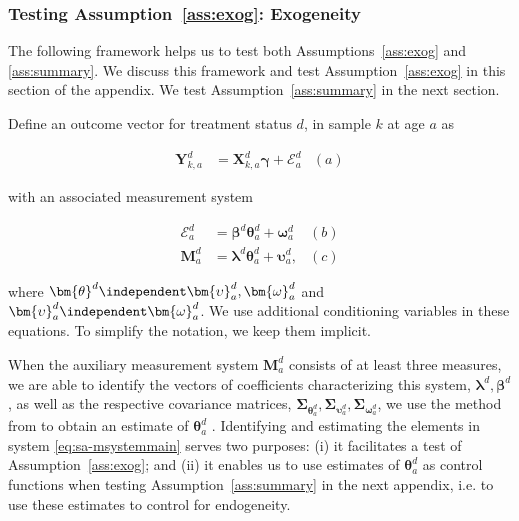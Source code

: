 \subsubsection{Testing Assumption~\ref{ass:exog}: Exogeneity} \label{app:endogeneity}

\noindent The following framework helps us to test both Assumptions~\ref{ass:exog} and \ref{ass:summary}. We discuss this framework and test Assumption~\ref{ass:exog} in this section of the appendix. We test Assumption~\ref{ass:summary} in the next section.

\noindent Define an outcome vector for treatment status $d$, in sample $k$ at age $a$ as

\begin{align}
\bm{Y}^d_{k,a} &= \bm{X}^d_{k,a} \bm{\gamma} + \mathcal{E}^d_a  &(a) \nonumber
\end{align}

\noindent with an associated measurement system

\begin{align}  \label{eq:sa-msystemmain}
\mathcal{E}_{a}^d &=\bm{\beta}^d \bm{\theta}_{a}^d + \bm{\omega}_{a}^d  &(b) \nonumber \\
\bm{M}_{a}^d &= \bm{\lambda}^d \bm{\theta}_{a}^d + \bm{\upsilon}_a^d,  &(c)
\end{align}


\noindent where $\bm{\theta}^d \independent \bm{\upsilon}_{a}^d, \bm{\omega}_{a}^d$ and $\bm{\upsilon}_{a}^d \independent \bm{\omega}_{a}^d$. We use additional conditioning variables in these equations. To simplify the notation, we keep them implicit.

\noindent When the auxiliary measurement system $\bm{M}_{a}^d $ consists of at least three measures, we are able to identify the vectors of coefficients characterizing this system, $\bm{\lambda}^d, \bm{\beta}^d$, as well as the respective covariance matrices, $\bm{\Sigma}_{\bm{\theta}_{a}^d}, \bm{\Sigma}_{\bm{\upsilon}_{a}^d}, \bm{\Sigma}_{\bm{\omega}_{a}^d}$, we use the method from \citet{Bartlett_1938_Nature} to obtain an estimate of $\bm{\theta}_{a}^d$ \citep{Heckman_Pinto_etal_2013_PerryFactor}. Identifying and estimating the elements in system \eqref{eq:sa-msystemmain} serves two purposes: (i) it facilitates a test of Assumption~\ref{ass:exog}; and (ii) it enables us to use estimates of $\bm{\theta}_{a}^d$ as control functions when testing Assumption~\ref{ass:summary} in the next appendix, i.e. to use these estimates to control for endogeneity.

